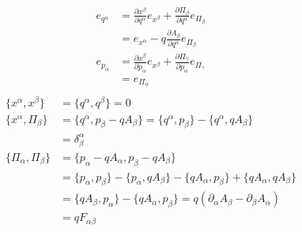 \documentclass[11pt]{article}
\begin{document}
\begin{equation}
\begin{aligned}
e_{q^\alpha} &= \frac{\partial x^\beta }{\partial q^\alpha}e_{x^\beta} + \frac{\partial \Pi_\beta}{\partial q^\alpha}e_{\Pi_\beta} \\
&= e_{x^\alpha} - q \frac{\partial A_\beta}{\partial q^\alpha}e_{\Pi_\beta} \\
e_{p_\alpha} &= \frac{\partial x^\beta}{\partial p_\alpha}e_{x^\beta} + \frac{\partial \Pi_\gamma}{\partial p_\alpha}e_{\Pi_\gamma} \\
&= e_{\Pi_\alpha} \\
\end{aligned}
\end{equation}
\begin{equation}
\begin{aligned}
\{x^\alpha, x^\beta\} &= \{q^\alpha, q^\beta\} = 0 \\
\{x^\alpha, \Pi_\beta\} &= \{q^\alpha, p_\beta - q A_\beta\} = \{q^\alpha, p_\beta\} - \{q^\alpha, q A_\beta\} \\
&= \delta^\alpha_\beta \\
\{ \Pi_\alpha, \Pi_\beta\} &= \{p_\alpha - q A_\alpha, p_\beta - q A_\beta\} \\
&= \{p_\alpha, p_\beta\} - \{p_\alpha, q A_\beta\} - \{q A_\alpha, p_\beta\} + \{q A_\alpha , q A_\beta\} \\
&= \{q A_\beta, p_\alpha\} - \{q A_\alpha, p_\beta\} = q (\partial_\alpha A_\beta - \partial_\beta A_\alpha) \\
&= q F_{\alpha \beta} \\
\end{aligned}
\end{equation}
\end{document}
